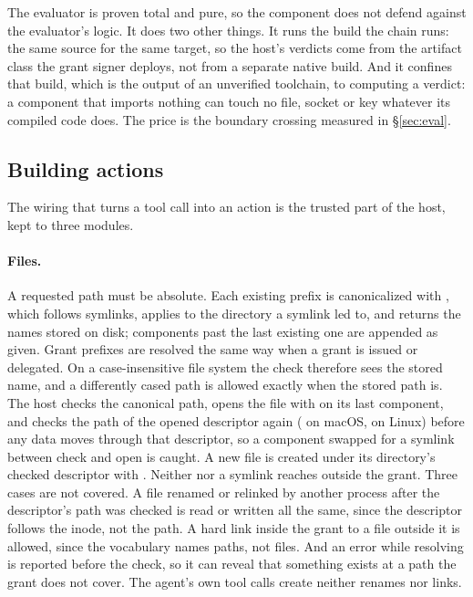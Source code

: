 The evaluator is proven total and pure, so the component does not defend
against the evaluator's logic. It does two other things. It runs the build the
chain runs: the same source for the same  target, so the
host's verdicts come from the artifact class the grant signer deploys, not
from a separate native build. And it confines that build, which is the output
of an unverified toolchain, to computing a verdict: a component that imports
nothing can touch no file, socket or key whatever its compiled code does. The
price is the boundary crossing measured in \S\ref{sec:eval}.

\subsection{Building actions}

The wiring that turns a tool call into an action is the trusted part of the
host, kept to three modules.

\paragraph{Files.} A requested path must be absolute. Each existing prefix is
canonicalized with , which follows symlinks, applies 
to the directory a symlink led to, and returns the names stored on disk;
components past the last existing one are appended as given. Grant prefixes
are resolved the same way when a grant is issued or delegated. On a
case-insensitive file system the check therefore sees the stored name, and a
differently cased path is allowed exactly when the stored path
is. The host checks the canonical path, opens the file with
 on its last component, and checks the path of the opened
descriptor again ( on macOS,  on Linux)
before any data moves through that descriptor, so a component swapped for a
symlink between check and open is caught. A new file is
created under its directory's checked descriptor with
. Neither  nor a symlink reaches
outside the grant. Three cases are not
covered. A file renamed or relinked by another process after the descriptor's
path was checked is read or written all the same, since the descriptor follows
the inode, not the path. A hard link inside the grant to a file outside it is
allowed, since the vocabulary names paths, not files. And an error while
resolving is reported before the check, so it can reveal that something
exists at a path the grant does not cover. The agent's own tool calls create
neither renames nor links.

